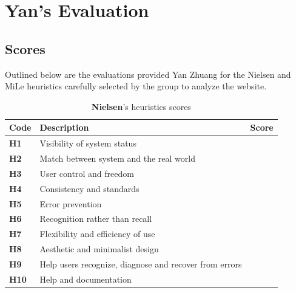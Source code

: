 
\section{Yan's Evaluation}
\subsection{Scores}
Outlined below are the evaluations provided Yan Zhuang for the Nielsen and MiLe heuristics carefully selected by the group to analyze the website.\\
\begin{table}[htp!]
	\centering
	\begin{tabular}{ |l|l|c| }
		\hline
		\textbf{Code} & \textbf{Description} & \textbf{Score}\\
		\hline
		\textbf{H1} & Visibility of system status & \textbf{\color{unicefOrange}{3}}\\
		\hline
		\textbf{H2} & Match between system and the real world & \textbf{\color{unicefGreen}{4}}\\
		\hline
		\textbf{H3} & User control and freedom & \textbf{\color{unicefGreen}{4}}\\
		\hline
		\textbf{H4} & Consistency and standards & \textbf{\color{unicefGreen}{4}}\\
		\hline
		\textbf{H5} & Error prevention & \textbf{\color{unicefGreen}{4}}\\
		\hline
		\textbf{H6} & Recognition rather than recall & \textbf{\color{unicefGreen}{4}}\\
		\hline
		\textbf{H7} & Flexibility and efficiency of use & \textbf{\color{unicefOrange}{3}}\\
		\hline
		\textbf{H8} & Aesthetic and minimalist design & \textbf{\color{unicefGreen}{4}}\\
		\hline
		\textbf{H9} & Help users recognize, diagnose and recover from errors & \textbf{\color{unicefGreen}{4}}\\
		\hline
		\textbf{H10} & Help and documentation & \textbf{\color{unicefGreen}{5}}\\
		\hline
	\end{tabular}
	\caption{\textbf{Nielsen}'s heuristics scores}
\end{table}
